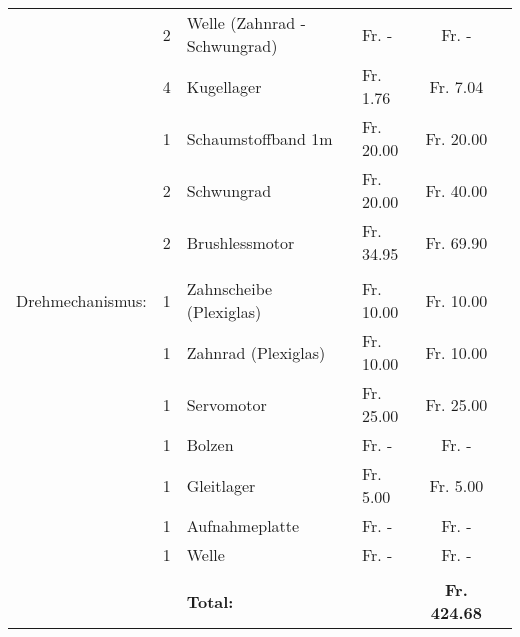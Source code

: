 \begin{longtable}{p{2cm}rllcc}
               & 2     & Welle (Zahnrad - Schwungrad) &  Fr. -    &  Fr. -    \\
          & 4     & Kugellager &  Fr. 1.76  &  Fr. 7.04  \\
          & 1     & Schaumstoffband 1m &  Fr. 20.00  &  Fr. 20.00  \\
          & 2     & Schwungrad &  Fr. 20.00  &  Fr. 40.00  \\
          & 2     & Brushlessmotor &  Fr. 34.95  &  Fr.  69.90  \\
          &       &       &       &  \\
    Drehmechanismus: & 1     & Zahnscheibe (Plexiglas) &  Fr. 10.00  &  Fr. 10.00  \\
          & 1     & Zahnrad (Plexiglas) &  Fr. 10.00  &  Fr. 10.00  \\
          & 1     & Servomotor &  Fr. 25.00  &  Fr. 25.00  \\
          & 1     & Bolzen &  Fr. -    &  Fr. -    \\
          & 1     & Gleitlager &  Fr. 5.00  &  Fr. 5.00  \\
          & 1     & Aufnahmeplatte &  Fr.              -    &  Fr. -    \\
          & 1     & Welle &  Fr. -    &  Fr. -    \\
          &       &       &       &  \\
          &       & \textbf{Total:} & \textbf{} & \textbf{ Fr. 424.68 } \\

    \end{longtable}
